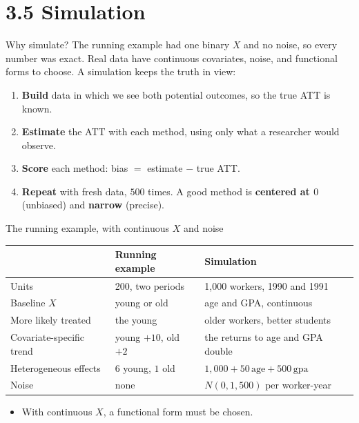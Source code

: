 \documentclass[
  11pt,
  ignorenonframetext,
  aspectratio=169,
]{beamer}
\newcounter{none} %
\providecommand{\tightlist}{%
  \setlength{\itemsep}{0pt}\setlength{\parskip}{0pt}}
\begin{document}
\section{3.5 Simulation}\label{simulation}

\begin{frame}{Why simulate?}
\protect{}\label{why-simulate}
The running example had one binary \(X\) and no noise, so every number
was exact. Real data have continuous covariates, noise, and functional
forms to choose. A simulation keeps the truth in view:

\begin{enumerate}
\tightlist
\item
  \textbf{Build} data in which we see both potential outcomes, so the
  true ATT is known.
\item
  \textbf{Estimate} the ATT with each method, using only what a
  researcher would observe.
\item
  \textbf{Score} each method: bias \(=\) estimate \(-\) true ATT.
\item
  \textbf{Repeat} with fresh data, \(500\) times. A good method is
  \textbf{centered at \(0\)} (unbiased) and \textbf{narrow} (precise).
\end{enumerate}
\end{frame}

\begin{frame}{The running example, with continuous \(X\) and noise}
\protect{}\label{the-running-example-with-continuous-x-and-noise}
\begin{center}\small
\begin{tabular}{lll}
\toprule
 & Running example & Simulation \\
\midrule
Units & 200, two periods & 1,000 workers, 1990 and 1991 \\
Baseline $X$ & young or old & age and GPA, continuous \\
More likely treated & the young & older workers, better students \\
Covariate-specific trend & young $+10$, old $+2$ & the returns to age and GPA double \\
Heterogeneous effects & $6$ young, $1$ old & $1{,}000 + 50\,\text{age} + 500\,\text{gpa}$ \\
Noise & none & $N(0, 1{,}500)$ per worker-year \\
\bottomrule
\end{tabular}
\end{center}

\begin{itemize}
\tightlist
\item
  With continuous \(X\), a functional form must be chosen.
\end{itemize}
\end{frame}
\end{document}
